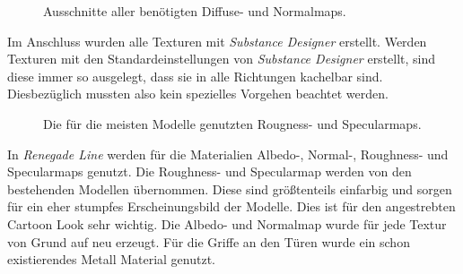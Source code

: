 \begin{figure}[H]
   \qquad
  \caption{Ausschnitte aller benötigten Diffuse- und Normalmaps.}%
\label{Textures}
\end{figure}
\vspace{-10.5pt}
Im Anschluss wurden alle Texturen mit \textit{Substance Designer} erstellt. Werden Texturen mit den Standardeinstellungen von \textit{Substance Designer} erstellt, sind diese immer so ausgelegt, dass sie in alle Richtungen kachelbar sind. Diesbezüglich mussten also kein spezielles Vorgehen beachtet werden.
\begin{figure}[H]
\centering
  \qquad
  \caption{Die für die meisten Modelle genutzten Rougness- und Specularmaps.}%
\label{altemaps}
\end{figure}
\vspace{-10.5pt}
In \textit{Renegade Line} werden für die Materialien Albedo-, Normal-, Roughness- und Specularmaps genutzt. Die Roughness- und Specularmap werden von den bestehenden Modellen übernommen. Diese sind größtenteils einfarbig und sorgen für ein eher stumpfes Erscheinungsbild der Modelle. Dies ist für den angestrebten Cartoon Look sehr wichtig. Die Albedo- und Normalmap wurde für jede Textur von Grund auf neu erzeugt. Für die Griffe an den Türen wurde ein schon existierendes Metall Material genutzt.

